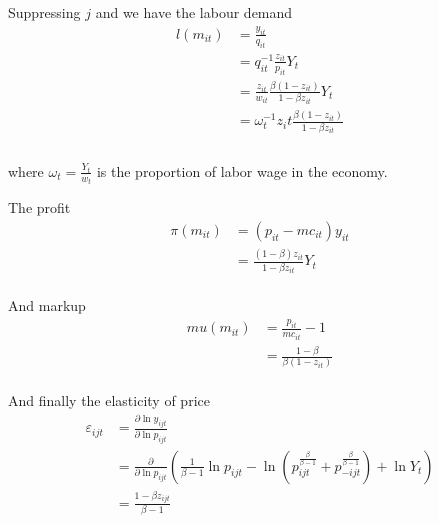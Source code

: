 \documentclass[12pt]{article} %
\begin{document}
Suppressing $j$ and we have the labour demand
\[\begin{aligned}
	l(m_{it}) &= \frac{y_{it}}{q_{it}}\\
	&= q_{it}^{-1}\frac{z_{it}}{p_{it}}Y_t\\
	&= \frac{z_{it}}{w_{it}}\frac{\beta(1-z_{it})}{1-\beta z_{it}} Y_t\\
	&= \omega_t^{-1} z_it \frac{\beta(1-z_{it})}{1-\beta z_{it}}\\
\end{aligned}\]\\

where $\omega_t = \frac{Y_t}{w_t}$ is the proportion of labor wage in the economy.

The profit
\[\begin{aligned}
	\pi (m_{it}) &= (p_{it}-mc_{it})y_{it}\\
	&= \frac{(1-\beta)z_{it}}{1-\beta z_{it}}Y_t\\
\end{aligned}\]

And markup
\[\begin{aligned}
	mu(m_{it}) &= \frac{p_{it}}{mc_{it}}-1\\
	&= \frac{1-\beta}{\beta(1-z_{it})}\\
\end{aligned}\]

And finally the elasticity of price
\[\begin{aligned}
	\varepsilon_{ijt} &= \frac{\partial \ln y_{ijt}}{\partial \ln p_{ijt}}\\
	&= \frac{\partial}{\partial\ln p_{ijt}} (\frac{1}{\beta-1}\ln p_{ijt}-\ln(p_{ijt}^\frac{\beta}{\beta-1}+p_{-ijt}^\frac{\beta}{\beta-1})+\ln Y_t)\\
	&= \frac{1-\beta z_{ijt}}{\beta-1} 
\end{aligned}\]


\footnotesize

%
\end{document}
